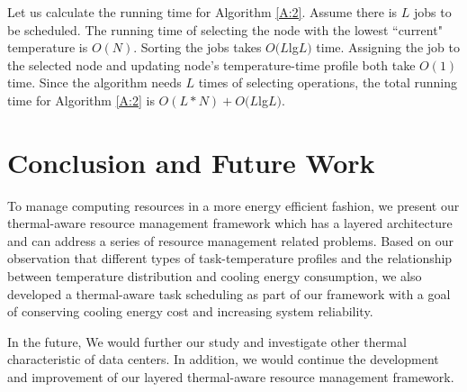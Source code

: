 Let us calculate the running time for Algorithm \ref{A:2}. Assume there is $L$ jobs to be scheduled. The running time of selecting the node with the lowest ``current" temperature is $O(N)$. Sorting the jobs takes $O(L$lg$L)$ time. Assigning the job to the selected node and updating node's temperature-time profile both take $O(1)$ time. Since the algorithm needs $L$ times of selecting operations, the total running time for Algorithm \ref{A:2} is $O(L*N)+O(L$lg$L)$.  


\section{Conclusion and Future Work}
To manage computing resources in a more energy efficient fashion, we present our thermal-aware resource management framework which has a layered architecture and can address a series of resource management related problems. Based on our observation that different types of task-temperature profiles and the relationship between temperature distribution and cooling energy consumption, we also developed a thermal-aware task scheduling as part of our framework with a goal of conserving cooling energy cost and increasing system reliability. 

In the future, We would further our study and investigate other thermal characteristic of data centers. In addition, we would continue the development and improvement of our layered thermal-aware resource management framework.